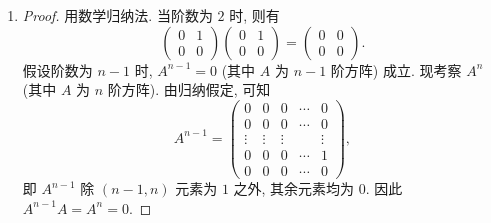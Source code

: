 \documentclass[a4paper, 11pt]{ctexart}
\begin{document}
\begin{enumerate}
\begin{proof}
\begin{align*}
                ={} & (I_n - A)I_n + (I_n - A)A + (I_n - A)A^2 + \cdots + (I_n - A)A^{n-1} \\
                ={} & I_n \cdot I_n - A + A - A^2 + A^2 - A^3 + \cdots + A^{n-1} - A^n \\
                ={} & I_n - A^n \\
                ={} & I_n. \qedhere    
            \end{align*}
        \end{proof}
    \item %
        \begin{proof}
            用数学归纳法. 当阶数为 $2$ 时, 则有
            \[
                \left(
                    \begin{array}{cccc}
                        0 & 1 \\
                        0 & 0
                    \end{array}
                \right)
                \left(
                    \begin{array}{cccc}
                        0 & 1 \\
                        0 & 0
                    \end{array}
                \right)
                =
                \left(
                    \begin{array}{cccc}
                        0 & 0 \\
                        0 & 0
                    \end{array}
                \right).   
            \]
            假设阶数为 $n - 1$ 时, $A^{n-1} = 0$ (其中 $A$ 为 $n-1$ 阶方阵) 成立. 现考察 $A^n$ (其中 $A$ 为 $n$ 阶方阵). 由归纳假定, 可知
            \[
                A^{n-1} =
                \left(
                    \begin{array}{ccccc}
                        0 & 0 & 0 & \cdots & 0 \\
                        0 & 0 & 0 & \cdots & 0 \\
                        \vdots & \vdots & \vdots &  & \vdots \\
                        0 & 0 & 0 & \cdots & 1 \\
                        0 & 0 & 0 & \cdots & 0
                    \end{array}
                \right),
            \] 
            即 $A^{n-1}$ 除 $(n-1, n)$ 元素为 $1$ 之外, 其余元素均为 $0$. 因此 $A^{n-1}A = A^n = 0$.
        \end{proof}

\end{enumerate}
\end{document}
